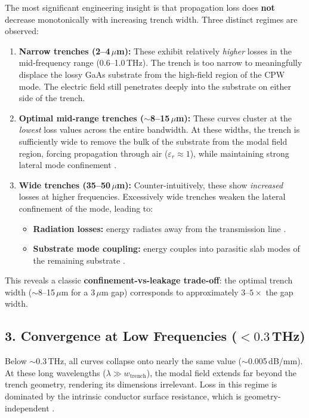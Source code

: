 The most significant engineering insight is that propagation loss does \textbf{not} decrease monotonically with increasing trench width. Three distinct regimes are observed:

\begin{enumerate}
    \item \textbf{Narrow trenches (2--4\,$\mu$m):} These exhibit relatively \textit{higher} losses in the mid-frequency range (0.6--1.0\,THz). The trench is too narrow to meaningfully displace the lossy GaAs substrate from the high-field region of the CPW mode. The electric field still penetrates deeply into the substrate on either side of the trench.

    \item \textbf{Optimal mid-range trenches ($\sim$8--15\,$\mu$m):} These curves cluster at the \textit{lowest} loss values across the entire bandwidth. At these widths, the trench is sufficiently wide to remove the bulk of the substrate from the modal field region, forcing propagation through air ($\varepsilon_r \approx 1$), while maintaining strong lateral mode confinement \cite{chalmers_cpw, ieee_mtt_cpw}.

    \item \textbf{Wide trenches (35--50\,$\mu$m):} Counter-intuitively, these show \textit{increased} losses at higher frequencies. Excessively wide trenches weaken the lateral confinement of the mode, leading to:
    \begin{itemize}
        \item \textbf{Radiation losses:} energy radiates away from the transmission line \cite{researchgate_cpw_radiation}.
        \item \textbf{Substrate mode coupling:} energy couples into parasitic slab modes of the remaining substrate \cite{arxiv_trenched_resonators}.
    \end{itemize}
\end{enumerate}

This reveals a classic \textbf{confinement-vs-leakage trade-off}: the optimal trench width ($\sim$8--15\,$\mu$m for a 3\,$\mu$m gap) corresponds to approximately $3$--$5\times$ the gap width.

\subsection*{3. Convergence at Low Frequencies ($< 0.3$\,THz)}

Below $\sim$0.3\,THz, all curves collapse onto nearly the same value ($\sim$0.005\,dB/mm). At these long wavelengths ($\lambda \gg w_{\mathrm{trench}}$), the modal field extends far beyond the trench geometry, rendering its dimensions irrelevant. Loss in this regime is dominated by the intrinsic conductor surface resistance, which is geometry-independent \cite{tampere_cpw}.

